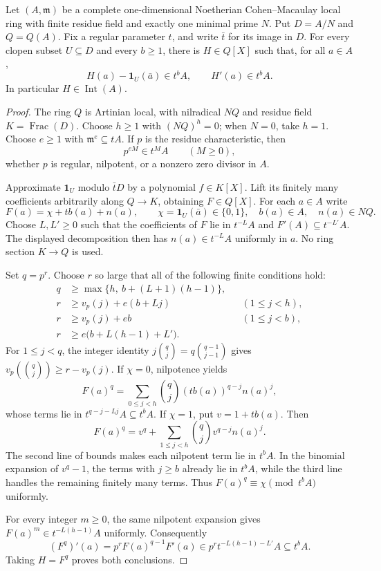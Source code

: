\begin{lemma}
\label{lem:binary-primary-indicators}
Let $(A,\mathfrak m)$ be a complete one-dimensional Noetherian
Cohen--Macaulay local ring with finite residue field and exactly
one minimal prime $N$.  Put $D=A/N$ and $Q=Q(A)$.
Fix a regular parameter $t$, and write $\bar t$ for its image in $D$.
For every clopen subset $U\subseteq D$ and every $b\ge1$, there is
$H\in Q[X]$ such that, for all $a\in A$,
\[
 H(a)-\mathbf1_U(\bar a)\in t^bA,
 \qquad H'(a)\in t^bA.
\]
In particular $H\in\operatorname{Int}(A)$.
\end{lemma}
\begin{proof}
The ring $Q$ is Artinian local, with nilradical $NQ$ and residue
field $K=\operatorname{Frac}(D)$.  Choose $h\ge1$ with $(NQ)^h=0$;
when $N=0$, take $h=1$.  Choose $e\ge1$ with
$\mathfrak m^e\subseteq tA$.  If $p$ is the residue characteristic,
then
\[
 p^{eM}\in t^MA\qquad(M\ge0),
\]
whether $p$ is regular, nilpotent, or a nonzero zero divisor in $A$.

Approximate $\mathbf1_U$ modulo $\bar tD$ by a polynomial
$f\in K[X]$.  Lift its finitely many coefficients arbitrarily along
$Q\to K$, obtaining $F\in Q[X]$.  For each $a\in A$ write
\[
 F(a)=\chi+tb(a)+n(a),\qquad
 \chi=\mathbf1_U(\bar a)\in\{0,1\},\quad
 b(a)\in A,\quad n(a)\in NQ.
\]
Choose $L,L'\ge0$ such that the coefficients of $F$ lie in
$t^{-L}A$ and $F'(A)\subseteq t^{-L'}A$.  The displayed
decomposition then has $n(a)\in t^{-L}A$ uniformly in $a$.
No ring section $K\to Q$ is used.

Set $q=p^r$.  Choose $r$ so large that all of the following finite
conditions hold:
\begin{align*}
 q&\ge\max\{h,\ b+(L+1)(h-1)\},\\
 r&\ge v_p(j)+e(b+Lj) &&(1\le j<h),\\
 r&\ge v_p(j)+eb &&(1\le j<b),\\
 r&\ge e\bigl(b+L(h-1)+L'\bigr).
\end{align*}
For $1\le j<q$, the integer identity
$j\binom qj=q\binom{q-1}{j-1}$ gives
$v_p(\binom qj)\ge r-v_p(j)$.
If $\chi=0$, nilpotence yields
\[
 F(a)^q=\sum_{0\le j<h}\binom qj
                  (tb(a))^{q-j}n(a)^j,
\]
whose terms lie in $t^{q-j-Lj}A\subseteq t^bA$.
If $\chi=1$, put $v=1+tb(a)$.  Then
\[
 F(a)^q=v^q+\sum_{1\le j<h}\binom qj v^{q-j}n(a)^j.
\]
The second line of bounds makes each nilpotent term lie in $t^bA$.
In the binomial expansion of $v^q-1$, the terms with $j\ge b$
already lie in $t^bA$, while the third line handles the remaining
finitely many terms.  Thus $F(a)^q\equiv\chi\pmod{t^bA}$ uniformly.

For every integer $m\ge0$, the same nilpotent expansion gives
$F(a)^m\in t^{-L(h-1)}A$ uniformly.  Consequently
\[
 (F^q)'(a)=p^rF(a)^{q-1}F'(a)
       \in p^rt^{-L(h-1)-L'}A\subseteq t^bA.
\]
Taking $H=F^q$ proves both conclusions.
\end{proof}

